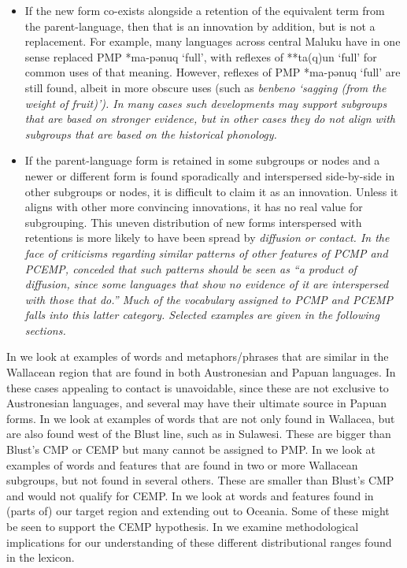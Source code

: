 \begin{itemize}
	\item	If the new form co-exists alongside a retention of the equivalent
				term from the parent-language,
				then that is an innovation by addition,
				but is not a replacement.
				For example, many languages across central Maluku have in one
				sense replaced PMP *ma-pənuq ‘full’,
				with reflexes of **ta(q)un ‘full’ for common uses of that meaning.
				However, reflexes of PMP *ma-pənuq ‘full’ are still found,
				albeit in more obscure uses (such as  \it{ben{\tl}beno} ‘sagging
				(from the weight of fruit)’).
				In many cases such developments may support subgroups that are
				based on stronger evidence,
				but in other cases they do not align with subgroups that are
				based on the historical phonology.

	\item	If the parent-language form is retained in some subgroups or
				nodes and a newer or different form is found sporadically
				and interspersed side-by-side in other subgroups or nodes,
				it is difficult to claim it as an innovation.
				Unless it aligns with other more convincing innovations,
				it has no real value for subgrouping.
				This uneven distribution of new forms interspersed with retentions
				is more likely to have been spread by \it{diffusion} or contact.
				In the face of criticisms regarding similar patterns of other
				features of PCMP and PCEMP, \citet[72]{Blust2009} conceded that such patterns
				should be seen as “a product of diffusion,
				since some languages that show no evidence of it are interspersed
				with those that do.” Much of the vocabulary assigned to PCMP
				and PCEMP falls into this latter category.
				Selected examples are given in the following sections.	
\end{itemize}

In  we look at examples of words
and metaphors/phrases that are similar in the Wallacean
region that are found in both Austronesian and Papuan languages.
In these cases appealing to contact is unavoidable,
since these are not exclusive to Austronesian languages,
and several may have their ultimate source in Papuan forms.
In  we look at examples of words that are not only
found in Wallacea, but are also found west of the Blust line,
such as in Sulawesi.
These are bigger than Blust's CMP or CEMP but many cannot be assigned to PMP.
In  we look at examples of words
and features that are found in two or more Wallacean subgroups,
but not found in several others.
These are smaller than Blust's CMP and would not qualify for CEMP.
In  we look at words
and features found in (parts of) our target region
and extending out to Oceania.
Some of these might be seen to support the CEMP hypothesis.
In  we examine methodological implications for
our understanding of these different distributional ranges found
in the lexicon.